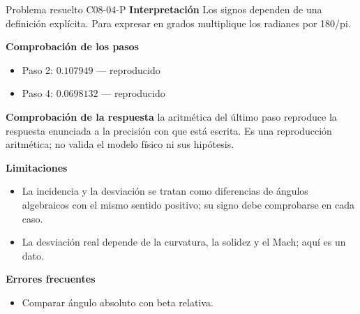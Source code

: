 \documentclass[10pt,openany]{book}
\begin{document}
\begin{studiumworked}{Problema resuelto C08-04-P}
\noindent\textbf{Interpretación}
Los signos dependen de una definición explícita. Para expresar en grados multiplique los radianes por 180/pi.

\noindent\textbf{Comprobación de los pasos}
\begin{itemize}
\item Paso 2: $0.107949$ — reproducido
\item Paso 4: $0.0698132$ — reproducido
\end{itemize}

\noindent\textbf{Comprobación de la respuesta} la aritmética del último paso reproduce la respuesta enunciada a la precisión con que está escrita. Es una reproducción aritmética; no valida el modelo físico ni sus hipótesis.

\noindent\textbf{Limitaciones}
\begin{itemize}
\item La incidencia y la desviación se tratan como diferencias de ángulos algebraicos con el mismo sentido positivo; su signo debe comprobarse en cada caso.
\item La desviación real depende de la curvatura, la solidez y el Mach; aquí es un dato.
\end{itemize}

\noindent\textbf{Errores frecuentes}
\begin{itemize}
\item Comparar ángulo absoluto con beta relativa.
\end{itemize}
\end{studiumworked}
\end{document}
